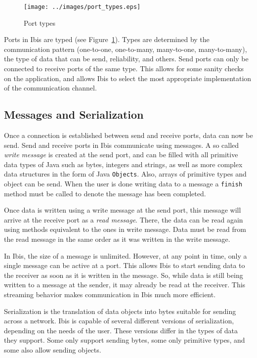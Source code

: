 \documentclass[10pt]{article}
\begin{document}
\begin{figure} \centering
\texttt{[image: ../images/port\_types.eps]}
\caption{Port types} \label{port_types}
\end{figure}

Ports in Ibis are typed (see Figure~\ref{port_types}). Types are
determined by the communication pattern (one-to-one, one-to-many,
many-to-one, many-to-many), the type of data that can be send,
reliability, and others. Send ports can only be connected to receive
ports of the same type. This allows for some sanity checks on the
application, and allows Ibis to select the most appropriate
implementation of the communication channel.

\subsection{Messages and Serialization}


Once a connection is established between send and receive ports, data
can now be send. Send and receive ports in Ibis communicate using
messages. A so called \emph{write message} is created at the send port,
and can be filled with all primitive data types of Java such as bytes, integers
and strings, as well as more complex data structures in the form of
Java \texttt{Objects}. Also, arrays of primitive types and object can be
send. When the user is done writing data to a message a \texttt{finish}
method must be called to denote the message has been completed.

Once data is written using a write message at the send port, this
message will arrive at the receive port as a \emph{read message}. There,
the data can be read again using methods equivalent to the ones in
write message. Data must be read from the read message in the same order
as it was written in the write message.

In Ibis, the size of a message is unlimited. However, at any point in
time, only a single message can be active at a port. This allows Ibis to
start sending data to the receiver as soon as it is written in the
message. So, while data is still being written to a message at the
sender, it may already be read at the receiver. This streaming behavior
makes communication in Ibis much more efficient.

Serialization is the translation of data objects into bytes suitable for
sending across a network. Ibis is capable of several different versions
of serialization, depending on the needs of the user. These versions
differ in the types of data they support. Some only support sending
bytes, some only primitive types, and some also allow sending objects.
\end{document}
